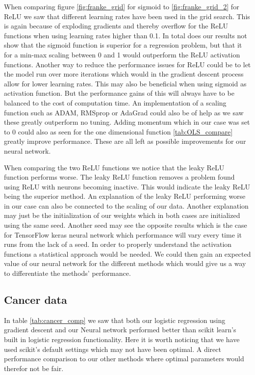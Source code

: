 \documentclass[11pt]{article}
\begin{document}
When comparing figure \ref{fig:franke_grid} for sigmoid to \ref{fig:franke_grid_2} for ReLU we saw that different learning rates have been used in the grid search. This is again because of exploding gradients and thereby overflow for the ReLU functions when using learning rates higher than 0.1. In total does our results not show that the sigmoid function is superior for a regression problem, but that it for a min-max scaling between 0 and 1 would outperform the ReLU activation functions. Another way to reduce the performance issues for ReLU could be to let the model run over more iterations which would in the gradient descent process allow for lower learning rates. This may also be beneficial when using sigmoid as activation function. But the performance gains of this will always have to be balanced to the cost of computation time. An implementation of a scaling function such as ADAM, RMSprop or AdaGrad could also be of help as we saw these greatly outperform no tuning. Adding momentum which in our case was set to 0 could also as seen for the one dimensional function \ref{tab:OLS_compare} greatly improve performance. These are all left as possible improvements for our neural network.

When comparing the two ReLU functions we notice that the leaky ReLU function performs worse. The leaky ReLU function removes a problem found using ReLU with neurons becoming inactive. This would indicate the leaky ReLU being the superior method. An explanation of the leaky ReLU performing worse in our case can also be connected to the scaling of our data. Another explanation may just be the initialization of our weights which in both cases are initialized using the same seed. Another seed may see the opposite results which is the case for TensorFlow keras neural network which performance will vary every time it runs from the lack of a seed. In order to properly understand the activation functions a statistical approach would be needed. We could then gain an expected value of our neural network for the different methods which would give us a way to differentiate the methods' performance.

\subsection{Cancer data}
In table \ref{tab:cancer_comp} we saw that both our logistic regression using gradient descent and our Neural network performed better than scikit learn's built in logistic regression functionality. Here it is worth noticing that we have used scikit's default settings which may not have been optimal. A direct performance comparison to our other methods where optimal parameters would therefor not be fair.
\end{document}
